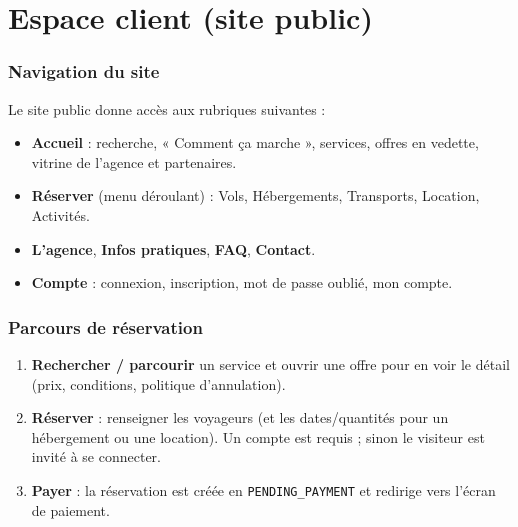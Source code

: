 \documentclass[11pt,a4paper]{article}
\newcommand{\etat}[1]{\textcolor{taNavy}{\texttt{#1}}}
\begin{document}
\part{Espace client (site public)}

\section{Navigation du site}
Le site public donne accès aux rubriques suivantes :
\begin{itemize}[leftmargin=1.4em]
  \item \textbf{Accueil} : recherche, « Comment ça marche », services, offres en vedette, vitrine de l'agence et partenaires.
  \item \textbf{Réserver} (menu déroulant) : Vols, Hébergements, Transports, Location, Activités.
  \item \textbf{L'agence}, \textbf{Infos pratiques}, \textbf{FAQ}, \textbf{Contact}.
  \item \textbf{Compte} : connexion, inscription, mot de passe oublié, mon compte.
\end{itemize}

\section{Parcours de réservation}
\begin{enumerate}[leftmargin=1.6em]
  \item \textbf{Rechercher / parcourir} un service et ouvrir une offre pour en voir le détail
        (prix, conditions, politique d'annulation).
  \item \textbf{Réserver} : renseigner les voyageurs (et les dates/quantités pour un hébergement
        ou une location). Un compte est requis ; sinon le visiteur est invité à se connecter.
  \item \textbf{Payer} : la réservation est créée en \etat{PENDING\_PAYMENT} et redirige vers
        l'écran de paiement.
\end{enumerate}
\end{document}
